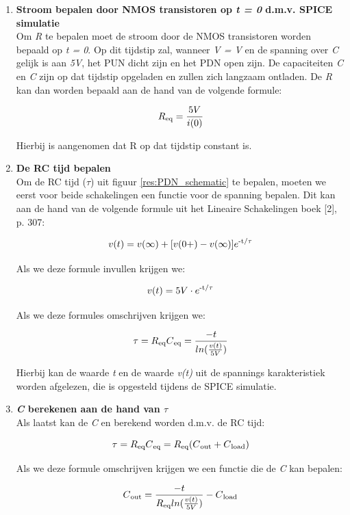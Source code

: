 \documentclass{article}
\begin{document}
\begin{enumerate}

\item \textbf{Stroom bepalen door NMOS transistoren op \emph{t = 0} d.m.v. SPICE simulatie}\\
Om \emph{R} te bepalen moet de stroom door de NMOS transistoren worden bepaald op \emph{t = 0}. Op dit tijdstip zal, wanneer \emph{V = V} en de spanning over \emph{C} gelijk is aan \emph{5V}, het PUN dicht zijn en het PDN open zijn.  De capaciteiten \emph{C} en \emph{C} zijn op dat tijdstip opgeladen en zullen zich langzaam ontladen. De \emph{R} kan dan worden bepaald aan de hand van de volgende formule:

\begin{equation}
R\textsubscript{eq} = \frac{5V}{i(0)}
\end{equation}

Hierbij is aangenomen dat R op dat tijdstip constant is.

\item \textbf{De RC tijd bepalen}\\
Om de RC tijd ($\tau$) uit figuur \ref{res:PDN_schematic} te bepalen, moeten we eerst voor beide schakelingen een functie voor de spanning bepalen. Dit kan aan de hand van de volgende formule uit het Lineaire Schakelingen boek [2], p. 307:

\begin{equation}
v(t) = v(\infty) + [v(0+) - v(\infty)]e\textsuperscript{-t/$\tau$}
\end{equation}

Als we deze formule invullen krijgen we:

\begin{equation}
v(t) = 5V \cdot e\textsuperscript{-t/$\tau$}
\end{equation}

Als we deze formules omschrijven krijgen we:

\begin{equation}
\tau = R\textsubscript{eq}C\textsubscript{eq} = \frac{-t}{ln(\frac{v(t)}{5V})}
\end{equation}

Hierbij kan de waarde \emph{t} en de waarde \emph{v(t)} uit de spannings karakteristiek worden afgelezen, die is opgesteld tijdens de SPICE simulatie.

\item \textbf{\emph{C} berekenen aan de hand van $\tau$}\\
Als laatst kan de \emph{C} en berekend worden d.m.v. de RC tijd:

\begin{equation}
\tau = R\textsubscript{eq}C\textsubscript{eq} = R\textsubscript{eq}(C\textsubscript{out} + C\textsubscript{load})
\end{equation}

Als we deze formule omschrijven krijgen we een functie die de \emph{C} kan bepalen:

\begin{equation}
C\textsubscript{out} = \frac{-t}{R\textsubscript{eq} ln(\frac{v(t)}{5V})} - C\textsubscript{load}
\end{equation}

\end{enumerate}
\end{document}
